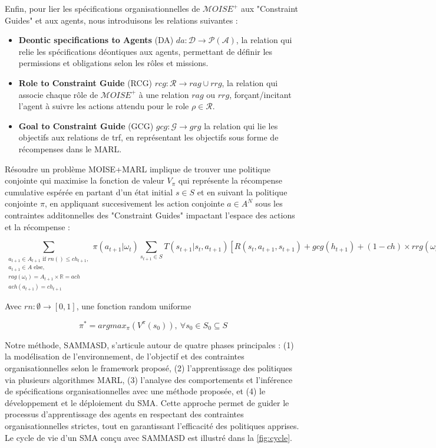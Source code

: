 \documentclass[sigconf,anonymous]{aamas}
\begin{document}
Enfin, pour lier les spécifications organisationnelles de $\mathcal{M}OISE^+$ aux "Constraint Guides" et aux agents, nous introduisons les relations suivantes :
\begin{itemize}
    \item \textbf{Deontic specifications to Agents} (DA) \quad $da: \mathcal{D} \rightarrow \mathcal{P}(\mathcal{A})$, la relation qui relie les spécifications déontiques aux agents, permettant de définir les permissions et obligations selon les rôles et missions.
    \item \textbf{Role to Constraint Guide} (RCG) \quad $rcg: \mathcal{R} \rightarrow rag \cup rrg$, la relation qui associe chaque rôle de $\mathcal{M}OISE^+$ à une relation $rag$ ou $rrg$, forçant/incitant l'agent à suivre les actions attendu pour le role $\rho \in \mathcal{R}$.
    \item \textbf{Goal to Constraint Guide} (GCG) \quad $gcg: \mathcal{G} \rightarrow grg$ la relation qui lie les objectifs aux relations de trf, en représentant les objectifs sous forme de récompenses dans le MARL.
\end{itemize}

Résoudre un problème MOISE+MARL implique de trouver une politique conjointe qui maximise la fonction de valeur $V_\pi$ qui représente la récompense cumulative espérée en partant d'un état initial $s \in S$ et en suivant la politique conjointe $\pi$, en appliquant succesivement les action conjointe $a \in A^N$ sous les contraintes additonnelles des "Constraint Guides" impactant l'espace des actions et la récompense :

\begin{figure*}
\[
  \sum_{\substack{
    a_{t+1} \in A_{t+1} \text{ if } rn() \leq ch_{t+1}, \\ 
    a_{t+1} \in A \text{ else, } \\
    rag(\omega_t) = A_{t+1} \times \mathbb{R} = ach \\
    ach(a_{t+1}) = ch_{t+1}
}}{\pi(a_{t+1} | \omega_t)} \sum_{s_{t+1} \in S}{T(s_{t+1} | s_t, a_{t+1}) [R(s_t,a_{t+1},s_{t+1}) + gcg(h_{t+1}) + (1-ch) \times rrg(\omega_t,a_{t+1})]}
\]
\end{figure*}

Avec $rn: \emptyset \to [0,1]$, une fonction random uniforme

\[
  \pi^* = argmax_{\pi}(V^\pi(s_0)), \ \forall s_0 \in S_0 \subseteq S
\]

Notre méthode, SAMMASD, s'articule autour de quatre phases principales : (1) la modélisation de l'environnement, de l'objectif et des contraintes organisationnelles selon le framework proposé, (2) l'apprentissage des politiques via plusieurs algorithmes MARL, (3) l'analyse des comportements et l'inférence de spécifications organisationnelles avec une méthode proposée, et (4) le développement et le déploiement du SMA. Cette approche permet de guider le processus d'apprentissage des agents en respectant des contraintes organisationnelles strictes, tout en garantissant l'efficacité des politiques apprises. Le cycle de vie d'un SMA conçu avec SAMMASD est illustré dans la \autoref{fig:cycle}.
\end{document}
